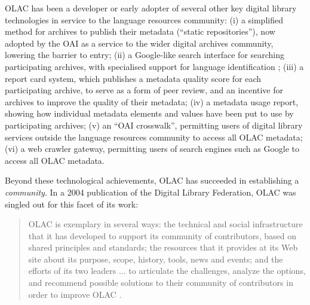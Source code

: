 
OLAC has been a developer or early adopter of several other key
digital library technologies in service to the language resources
community:
(i) a simplified method for archives to publish their metadata
  (``static repositories''), now adopted by the OAI as a service
  to the wider digital archives community, lowering the barrier to entry;
(ii) a Google-like search interface for searching participating
  archives, with specialised support for language identification
  \citep{HughesKamat05,Hughes06lrec};
(iii) a report card system, which publishes a metadata quality score
  for each participating archive, to serve as a form of
  peer review, and an incentive for archives to improve the quality of
  their metadata;
(iv) a metadata usage report, showing how individual metadata
  elements and values have been put to use by participating archives;
(v) an ``OAI crosswalk'', permitting users of digital library services
  outside the language resources community to access all OLAC metadata;
(vi) a web crawler gateway, permitting users of search engines such
  as Google to access all OLAC metadata.

Beyond these technological achievements, OLAC has succeeded in
establishing a \emph{community}.  In a 2004 publication of the
Digital Library Federation, OLAC was singled out for this
facet of its work:

\begin{quote} \small
  OLAC is exemplary in several ways: the technical and social
  infrastructure that it has developed to support its community of
  contributors, based on shared principles and standards; the
  resources that it provides at its Web site about its purpose, scope,
  history, tools, news and events; and the efforts of its two leaders
  ... to articulate the challenges, analyze the options, and recommend
  possible solutions to their community of contributors in order to
  improve OLAC \citep{Brogan04}.
\end{quote}

\vspace{1in}


